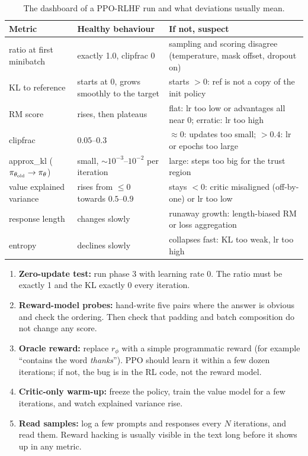 \begin{table}[ht]
\centering\small
\begin{tabularx}{\linewidth}{@{}lXX@{}}
\toprule
\textbf{Metric} & \textbf{Healthy behaviour} & \textbf{If not, suspect}\\
\midrule
ratio at first minibatch & exactly 1.0, clipfrac 0 & sampling and scoring disagree (temperature, mask offset, dropout on)\\
KL to reference & starts at 0, grows smoothly to the target & starts $>0$: ref is not a copy of the init policy\\
RM score & rises, then plateaus & flat: lr too low or advantages all near 0; erratic: lr too high\\
clipfrac & $0.05$--$0.3$ & $\approx 0$: updates too small; $>0.4$: lr or epochs too large\\
approx\_kl ($\pi_{\theta_{\text{old}}}\to\pi_\theta$) & small, $\sim10^{-3}$--$10^{-2}$ per iteration & large: steps too big for the trust region\\
value explained variance & rises from $\le0$ towards $0.5$--$0.9$ & stays $<0$: critic misaligned (off-by-one) or lr too low\\
response length & changes slowly & runaway growth: length-biased RM or loss aggregation\\
entropy & declines slowly & collapses fast: KL too weak, lr too high\\
\bottomrule
\end{tabularx}
\caption{The dashboard of a PPO-RLHF run and what deviations usually mean.}
\label{tab:rlhf:dashboard}
\end{table}

\begin{deepdive}
\begin{enumerate}
  \item \textbf{Zero-update test:} run phase 3 with learning rate 0. The ratio must be exactly 1 and the KL
        exactly 0 every iteration.
  \item \textbf{Reward-model probes:} hand-write five pairs where the answer is obvious and check the
        ordering. Then check that padding and batch composition do not change any score.
  \item \textbf{Oracle reward:} replace $r_\phi$ with a simple programmatic reward (for example ``contains
        the word \emph{thanks}''). PPO should learn it within a few dozen iterations; if not, the bug
        is in the RL code, not the reward model.
  \item \textbf{Critic-only warm-up:} freeze the policy, train the value model for a few iterations, and
        watch explained variance rise.
  \item \textbf{Read samples:} log a few prompts and responses every $N$ iterations, and read them. Reward
        hacking is usually visible in the text long before it shows up in any metric.
\end{enumerate}
\end{deepdive}

